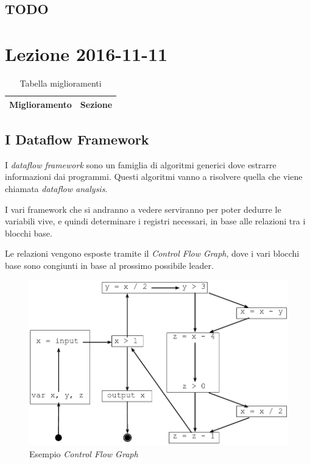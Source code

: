 \subsection{TODO}
\section{Lezione 2016-11-11}
\begin{table}[H]
\begin{center}
\begin{tabular}{|p{\textwidth}|c|}
\hline
\multicolumn{1}{|c|}{\textbf{Miglioramento}} & \textbf{Sezione} \\ \hline
\end{tabular}
\end{center}
\caption{Tabella miglioramenti}
\label{tab:tab_todo}
\end{table}

\subsection{I Dataflow Framework}
I \textit{dataflow framework} sono un famiglia di algoritmi generici dove
estrarre informazioni dai programmi. Questi algoritmi vanno a risolvere quella
che viene chiamata \textit{dataflow analysis}.

I vari framework che si andranno a vedere serviranno per poter dedurre le
variabili vive, e quindi determinare i registri necessari, in base alle
relazioni tra i blocchi base.

Le relazioni vengono esposte tramite il \textit{Control Flow Graph}, dove i
vari blocchi base sono congiunti in base al prossimo possibile leader.

\begin{figure}[H]
  \centering
  \includegraphics[scale=0.4]{res/image/control_flow_graph}
  \caption{Esempio \textit{Control Flow Graph}}
  \label{img:control_flow_graph}
\end{figure}


